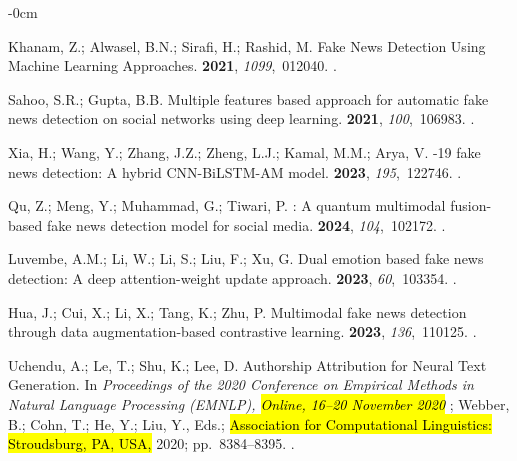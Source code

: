 \documentclass[electronics,article,accept,pdftex,moreauthors,electronics]{Definitions/mdpi}
\begin{document}
\begin{adjustwidth}{-\extralength}{0cm}
\begin{thebibliography}{999}
Khanam, Z.; Alwasel, B.N.; Sirafi, H.; Rashid, M.
\newblock Fake {News} {Detection} {Using} {Machine} {Learning} {Approaches}.
 {\bf
  2021}, {\em 1099},~012040.
.

Sahoo, S.R.; Gupta, B.B.
\newblock Multiple features based approach for automatic fake news detection on
  social networks using deep learning.
 {\bf 2021}, {\em 100},~106983.
.

Xia, H.; Wang, Y.; Zhang, J.Z.; Zheng, L.J.; Kamal, M.M.; Arya, V.
-19 fake news detection: {A} hybrid {CNN}-{BiLSTM}-{AM} model.
 {\bf 2023}, {\em 195},~122746.
.

Qu, Z.; Meng, Y.; Muhammad, G.; Tiwari, P.
: {A} quantum multimodal fusion-based fake news detection
  model for social media.
 {\bf 2024}, {\em 104},~102172.
.

Luvembe, A.M.; Li, W.; Li, S.; Liu, F.; Xu, G.
\newblock Dual emotion based fake news detection: {A} deep attention-weight
  update approach.
 {\bf 2023}, {\em 60},~103354.
.

Hua, J.; Cui, X.; Li, X.; Tang, K.; Zhu, P.
\newblock Multimodal fake news detection through data augmentation-based
  contrastive learning.
 {\bf 2023}, {\em 136},~110125.
.

Uchendu, A.; Le, T.; Shu, K.; Lee, D.
\newblock Authorship {Attribution} for {Neural} {Text} {Generation}.
\newblock In \emph{Proceedings of the 2020 Conference on Empirical Methods in Natural Language Processing (EMNLP), \hl{Online, 16--20 November 2020}%
}; Webber, B.; Cohn, T.; He, Y.; Liu, Y., Eds.; \hl{Association for Computational Linguistics: Stroudsburg, PA, USA,} %
 2020; pp.~8384--8395.
.


\end{thebibliography}
\end{adjustwidth}
\end{document}

